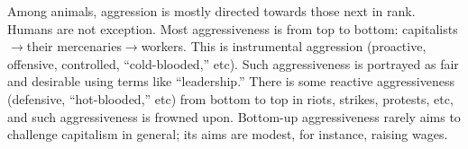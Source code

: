 \documentclass[11pt, letterpaper]{article}
\begin{document}
\begin{spacing}{2.0}

Among animals, aggression is mostly directed towards those next in rank. Humans are not exception.
Most aggressiveness is from top to
bottom: capitalists$\rightarrow$their mercenaries$\rightarrow$workers. This is
instrumental aggression (proactive, offensive, controlled, ``cold-blooded,'' etc).
Such
aggressiveness is portrayed as fair and desirable using terms like ``leadership.''
There is some reactive aggressiveness (defensive, ``hot-blooded,'' etc) from
bottom to top in riots, strikes, protests, etc, and
such aggressiveness is frowned upon. Bottom-up aggressiveness rarely aims to challenge capitalism in
general; its aims are modest, for instance, raising wages.



\end{spacing}
\end{document}
